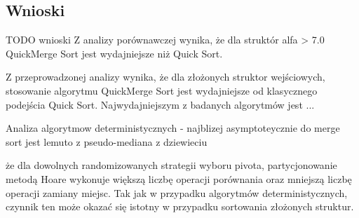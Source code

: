 \begin{figure}[]
	\centering
	
	\caption[]{}
	\label{fig:quick-merge-sort-nondeterministic-pivot-random}
\end{figure}

\begin{figure}[]
	\centering
	
	\caption[]{}
	\label{fig:quick-merge-sort-nondeterministic-pivot-density}
\end{figure}

\begin{figure}[]
	\centering
	
	\caption[]{}
	\label{fig:quick-merge-sort-nondeterministic-pivot-cost-factor}
\end{figure}

\subsection{Wnioski}
TODO wnioski
Z analizy porównawczej wynika, że dla struktór alfa > 7.0 QuickMerge Sort jest wydajniejsze niż Quick Sort.

Z przeprowadzonej analizy wynika, że dla złożonych struktor wejściowych, stosowanie algorytmu QuickMerge Sort jest wydajniejsze od klasycznego podejścia Quick Sort. Najwydajniejszym z badanych algorytmów jest ...

Analiza algorytmow deterministycznych - najblizej asymptoteycznie do merge sort jest lemuto z pseudo-mediana z dziewieciu

że dla dowolnych randomizowanych strategii wyboru pivota, partycjonowanie metodą Hoare wykonuje większą liczbę operacji porównania oraz mniejszą liczbę operacji zamiany miejsc. Tak jak w przypadku algorytmów deterministycznych, czynnik ten może okazać się istotny w przypadku sortowania złożonych struktur.\\